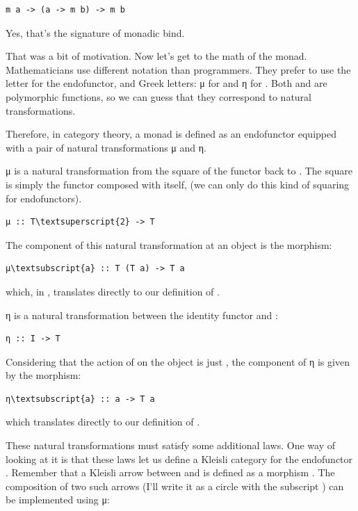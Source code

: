\begin{Verbatim}[commandchars=\\\{\}]
m a -> (a -> m b) -> m b
\end{Verbatim}
Yes, that's the signature of monadic bind.

That was a bit of motivation. Now let's get to the math of the monad.
Mathematicians use different notation than programmers. They prefer to
use the letter  for the endofunctor, and Greek letters: μ for
 and η for . Both  and
 are polymorphic functions, so we can guess that they
correspond to natural transformations.

Therefore, in category theory, a monad is defined as an endofunctor
 equipped with a pair of natural transformations μ and η.

μ is a natural transformation from the square of the functor 
back to . The square is simply the functor composed with
itself,  (we can only do this kind of squaring for
endofunctors).

\begin{Verbatim}[commandchars=\\\{\}]
μ :: T\textsuperscript{2} -> T
\end{Verbatim}
The component of this natural transformation at an object  is
the morphism:

\begin{Verbatim}[commandchars=\\\{\}]
μ\textsubscript{a} :: T (T a) -> T a
\end{Verbatim}
which, in , translates directly to our definition of
.

η is a natural transformation between the identity functor 
and :

\begin{Verbatim}[commandchars=\\\{\}]
η :: I -> T
\end{Verbatim}
Considering that the action of  on the object  is
just , the component of η is given by the morphism:

\begin{Verbatim}[commandchars=\\\{\}]
η\textsubscript{a} :: a -> T a
\end{Verbatim}
which translates directly to our definition of .

These natural transformations must satisfy some additional laws. One way
of looking at it is that these laws let us define a Kleisli category for
the endofunctor . Remember that a Kleisli arrow between
 and  is defined as a morphism
. The composition of two such arrows
(I'll write it as a circle with the subscript ) can be
implemented using μ:

